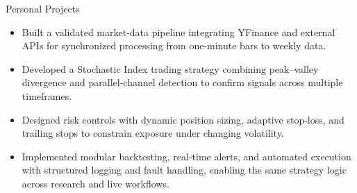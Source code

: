 \documentclass{resume} %
\begin{document}
\begin{workSection}{Personal Projects}
    \customItem[title=Hang Seng Index Futures Quantitative Trading System, keyHighlight=Multi-timeframe strategy{,} backtesting{,} and risk management, duration=Oct. 2024]
    \begin{itemize}
        \vspace{-0.5em}\itemsep -6pt {}
        \item Built a validated market-data pipeline integrating YFinance and external APIs for synchronized processing from one-minute bars to weekly data.
        \item Developed a Stochastic Index trading strategy combining peak--valley divergence and parallel-channel detection to confirm signals across multiple timeframes.
        \item Designed risk controls with dynamic position sizing, adaptive stop-loss, and trailing stops to constrain exposure under changing volatility.
        \item Implemented modular backtesting, real-time alerts, and automated execution with structured logging and fault handling, enabling the same strategy logic across research and live workflows.
    \end{itemize}




\end{workSection}
\end{document}
